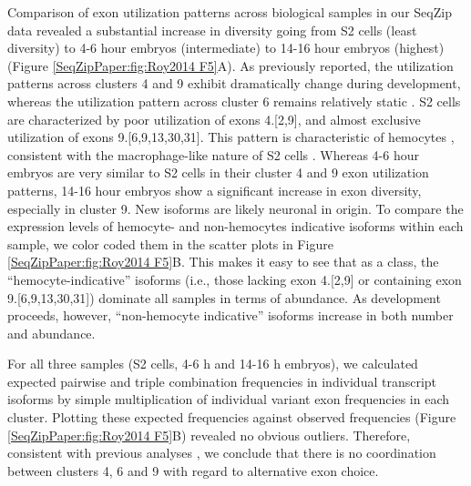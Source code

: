 		Comparison of exon utilization patterns across biological samples in our SeqZip data revealed a substantial increase in diversity going from S2 cells (least diversity) to 4-6 hour embryos (intermediate) to 14-16 hour embryos (highest) (Figure \ref{SeqZipPaper:fig:Roy2014 F5}A). As previously reported, the utilization patterns across clusters 4 and 9 exhibit dramatically change during development, whereas the utilization pattern across cluster 6 remains relatively static \citep{Celotto2001,Neves2004,Zhan2004,Sun2013,Miura2013b}. S2 cells are characterized by poor utilization of exons 4.[2,9], and almost exclusive utilization of exons 9.[6,9,13,30,31]. This pattern is characteristic of hemocytes \citep{Watson2005}, consistent with the macrophage-like nature of S2 cells \citep{Schneider1972}. Whereas 4-6 hour embryos are very similar to S2 cells in their cluster 4 and 9 exon utilization patterns, 14-16 hour embryos show a significant increase in exon diversity, especially in cluster 9. New isoforms are likely neuronal in origin. To compare the expression levels of hemocyte- and non-hemocytes indicative isoforms within each sample, we color coded them in the scatter plots in Figure \ref{SeqZipPaper:fig:Roy2014 F5}B. This makes it easy to see that as a class, the ``hemocyte-indicative'' isoforms (i.e., those lacking exon 4.[2,9] or containing exon 9.[6,9,13,30,31]) dominate all samples in terms of abundance. As development proceeds, however, ``non-hemocyte indicative'' isoforms increase in both number and abundance.

		For all three samples (S2 cells, 4-6 h and 14-16 h embryos), we calculated expected pairwise and triple combination frequencies in individual transcript isoforms by simple multiplication of individual variant exon frequencies in each cluster. Plotting these expected frequencies against observed frequencies (Figure \ref{SeqZipPaper:fig:Roy2014 F5}B) revealed no obvious outliers. Therefore, consistent with previous analyses \citep{Neves2004,Sun2013}, we conclude that there is no coordination between \dscam{} clusters 4, 6 and 9 with regard to alternative exon choice.
			
